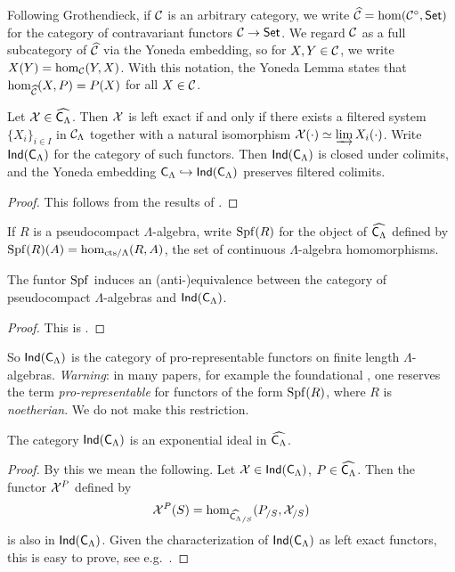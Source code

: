 \documentclass[phd,cornellheadings,draft]{cornell}
\begin{document}
Following Grothendieck, if $\mathcal{C}$ is an arbitrary category, we write 
$\widehat{\mathcal{C}}=\hom(\mathcal{C}^\circ,\mathsf{Set})$ for the category of contravariant functors 
$\mathcal{C}\to \mathsf{Set}$. We regard $\mathcal{C}$ as a full subcategory of $\widehat{\mathcal{C}}$ via the 
Yoneda embedding, so for $X,Y\in \mathcal{C}$, we write $X(Y) = \hom_{\mathcal{C}}(Y,X)$. With 
this notation, the Yoneda Lemma states that $\hom_{\widehat{\mathcal{C}}}(X,P) = P(X)$ 
for all $X\in \mathcal{C}$. 

\begin{lemma}\label{thm:ind-object-def}
Let $\mathcal{X}\in\widehat{\mathsf{C}_\Lambda}$. Then $\mathcal{X}$ is left exact if and only 
if there exists a filtered system $\{X_i\}_{i\in I}$ in $\mathcal{C}_\Lambda$ together 
with a natural isomorphism $\mathcal{X}(\cdot)\simeq \varinjlim X_i(\cdot)$. Write 
$\operatorname{\mathsf{Ind}}(\mathsf{C}_\Lambda)$ for the category of such functors. Then 
$\operatorname{\mathsf{Ind}}(\mathsf{C}_\Lambda)$ is closed under colimits, and the 
Yoneda embedding $\mathsf{C}_\Lambda\hookrightarrow\operatorname{\mathsf{Ind}}(\mathsf{C}_\Lambda)$ 
preserves filtered colimits.
\end{lemma}
\begin{proof}
This follows from the results of \cite[6.1]{kashiwara-schapira-2006}. 
\end{proof}

If $R$ is a pseudocompact $\Lambda$-algebra, write $\operatorname{Spf}(R)$ for the object of 
$\widehat{\mathsf{C}_\Lambda}$ defined by $\operatorname{Spf}(R)(A)=\hom_{\mathrm{cts}/\Lambda}(R,A)$, 
the set of continuous $\Lambda$-algebra homomorphisms. 

\begin{lemma}
The funtor $\operatorname{Spf}$ induces an (anti-)equivalence between the category of 
pseudocompact $\Lambda$-algebras and $\operatorname{\mathsf{Ind}}(\mathsf{C}_\Lambda)$. 
\end{lemma}
\begin{proof}
This is \cite[VII\textsubscript{B} 0.4.2 Prop.]{sga3-1}. 
\end{proof}

So $\operatorname{\mathsf{Ind}}(\mathsf{C}_\Lambda)$ is the category of pro-representable 
functors on finite length $\Lambda$-algebras. \emph{Warning}: in many papers, 
for example the foundational \cite{mazur-1995}, one reserves the term 
\emph{pro-representable} for functors of the form $\operatorname{Spf}(R)$, where $R$ is 
\emph{noetherian}. We do not make this restriction. 

\begin{lemma}\label{thm:exponential-ideal}
The category $\operatorname{\mathsf{Ind}}(\mathsf{C}_\Lambda)$ is an exponential ideal in 
$\widehat{\mathsf{C}_\Lambda}$. 
\end{lemma}
\begin{proof}
By this we mean the following. Let $\mathcal{X}\in \operatorname{\mathsf{Ind}}(\mathsf{C}_\Lambda)$, 
$P\in \widehat{\mathsf{C}_\Lambda}$. Then the functor $\mathcal{X}^P$ defined by 
\[
	\mathcal{X}^P(S) = \hom_{\widehat{\mathsf{C}_\Lambda}_{/S}}(P_{/S},\mathcal{X}_{/S}) 
\]
is also in $\operatorname{\mathsf{Ind}}(\mathsf{C}_\Lambda)$. Given the characterization of 
$\operatorname{\mathsf{Ind}}(\mathsf{C}_\Lambda)$ as left exact functors, this is easy to 
prove, see e.g.~\cite[4.2.3]{johnstone-2002}. 
\end{proof}
\end{document}

